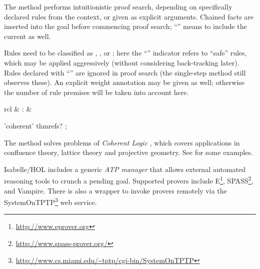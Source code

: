 \begin{isabellebody}
\begin{isamarkuptext}
  The \hyperlink{method.HOL.iprover}{\mbox{}} method performs intuitionistic proof
  search, depending on specifically declared rules from the context,
  or given as explicit arguments.  Chained facts are inserted into the
  goal before commencing proof search; ``\hyperlink{method.HOL.iprover}{\mbox{}}\isa{{\isachardoublequote}{\isacharbang}{\isachardoublequote}}''  means to include the current \hyperlink{fact.prems}{\mbox{}} as well.
  
  Rules need to be classified as \hyperlink{attribute.Pure.intro}{\mbox{}},
  \hyperlink{attribute.Pure.elim}{\mbox{}}, or \hyperlink{attribute.Pure.dest}{\mbox{}}; here the
  ``\isa{{\isachardoublequote}{\isacharbang}{\isachardoublequote}}'' indicator refers to ``safe'' rules, which may be
  applied aggressively (without considering back-tracking later).
  Rules declared with ``\isa{{\isachardoublequote}{\isacharquery}{\isachardoublequote}}'' are ignored in proof search (the
  single-step \hyperlink{method.rule}{\mbox{}} method still observes these).  An
  explicit weight annotation may be given as well; otherwise the
  number of rule premises will be taken into account here.%
\end{isamarkuptext}%
\isamarkuptrue%
%
\isamarkuptrue%
%
\begin{isamarkuptext}%
\begin{matharray}{rcl}
    \hypertarget{method.HOL.coherent}{\hyperlink{method.HOL.coherent}{\mbox{}}} & : &  \\
  \end{matharray}

  \begin{rail}
    'coherent' thmrefs?
    ;
  \end{rail}

  The \hyperlink{method.HOL.coherent}{\mbox{}} method solves problems of
  \emph{Coherent Logic} \cite{Bezem-Coquand:2005}, which covers
  applications in confluence theory, lattice theory and projective
  geometry.  See \hyperlink{file.~~/src/HOL/ex/Coherent.thy}{\mbox{}} for some
  examples.%
\end{isamarkuptext}%
\isamarkuptrue%
%
\isamarkuptrue%
%
\begin{isamarkuptext}%
Isabelle/HOL includes a generic \emph{ATP manager} that allows
  external automated reasoning tools to crunch a pending goal.
  Supported provers include E\footnote{\url{http://www.eprover.org}},
  SPASS\footnote{\url{http://www.spass-prover.org/}}, and Vampire.
  There is also a wrapper to invoke provers remotely via the
  SystemOnTPTP\footnote{\url{http://www.cs.miami.edu/~tptp/cgi-bin/SystemOnTPTP}}
  web service.


\end{isamarkuptext}
\end{isabellebody}
